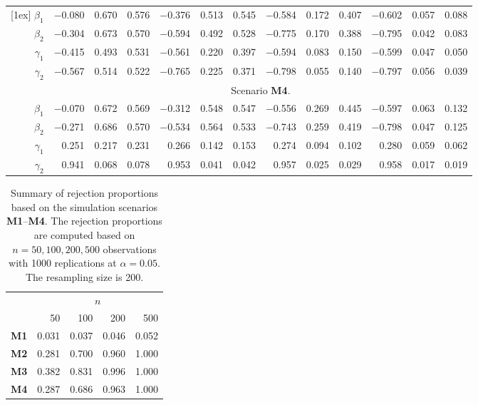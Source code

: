 \documentclass[a4paper,10pt]{article}
\begin{document}
\begin{table}[ht]
\begin{tabular}{r rrr rrr rrr rrr}
[1ex]
$\beta_1$ & $-$0.080 & 0.670 & 0.576 & $-$0.376 & 0.513 & 0.545 & $-$0.584 & 0.172 & 0.407 & $-$0.602 & 0.057 & 0.088 \\ 
$\beta_2$ & $-$0.304 & 0.673 & 0.570 & $-$0.594 & 0.492 & 0.528 & $-$0.775 & 0.170 & 0.388 & $-$0.795 & 0.042 & 0.083 \\ 
$\gamma_1$ & $-$0.415 & 0.493 & 0.531 & $-$0.561 & 0.220 & 0.397 & $-$0.594 & 0.083 & 0.150 & $-$0.599 & 0.047 & 0.050 \\ 
$\gamma_2$ & $-$0.567 & 0.514 & 0.522 & $-$0.765 & 0.225 & 0.371 & $-$0.798 & 0.055 & 0.140 & $-$0.797 & 0.056 & 0.039 \\ 
[1ex]
& \multicolumn{12}{c}{Scenario \textbf{M4}.}\\
[1ex]
$\beta_1$ & $-$0.070 & 0.672 & 0.569 & $-$0.312 & 0.548 & 0.547 & $-$0.556 & 0.269 & 0.445 & $-$0.597 & 0.063 & 0.132 \\ 
$\beta_2$ & $-$0.271 & 0.686 & 0.570 & $-$0.534 & 0.564 & 0.533 & $-$0.743 & 0.259 & 0.419 & $-$0.798 & 0.047 & 0.125 \\ 
$\gamma_1$ & 0.251 & 0.217 & 0.231 & 0.266 & 0.142 & 0.153 & 0.274 & 0.094 & 0.102 & 0.280 & 0.059 & 0.062 \\ 
$\gamma_2$ & 0.941 & 0.068 & 0.078 & 0.953 & 0.041 & 0.042 & 0.957 & 0.025 & 0.029 & 0.958 & 0.017 & 0.019 \\ 
\bottomrule
\end{tabular}
\end{table}

\begin{table}[ht]
\centering
\caption{Summary of rejection proportions based on the simulation scenarios \textbf{M1}--\textbf{M4}.
The rejection proportions are computed based on $n=50, 100, 200, 500$ observations with 1000 replications at $\alpha = 0.05$.
The resampling size is 200. 
}
\begin{tabular}{rrrrr}
\toprule
& \multicolumn{4}{c}{$n$}\\
\cmidrule(l){2-5}
& 50 & 100 & 200 & 500 \\
\midrule
\textbf{M1} & 0.031 & 0.037 & 0.046 & 0.052 \\ 
\textbf{M2} & 0.281 & 0.700 & 0.960 & 1.000 \\ 
\textbf{M3} & 0.382 & 0.831 & 0.996 & 1.000 \\ 
\textbf{M4} & 0.287 & 0.686 & 0.963 & 1.000 \\ 
\bottomrule
\end{tabular}
\end{table}
\end{document}
